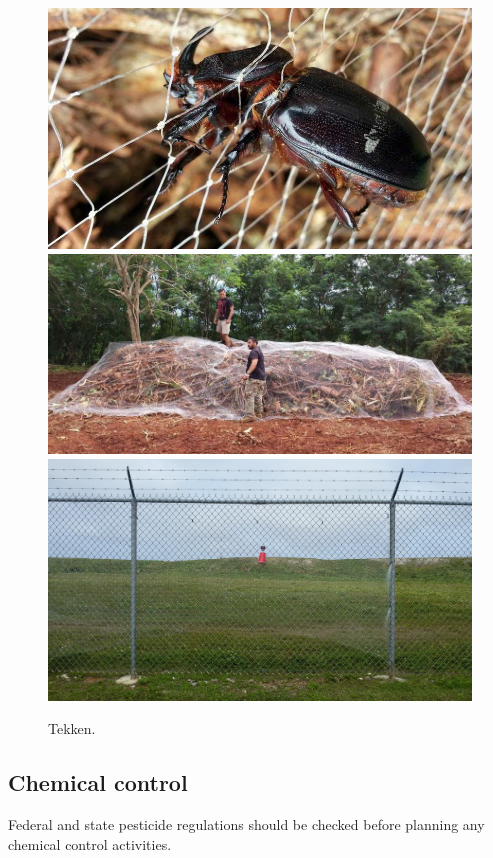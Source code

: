 \documentclass[twocolumn,letterpaper]{scrartcl}
\begin{document}
\begin{figure}[h]
	\centering
	\includegraphics[width=\linewidth]{images/tekken-beetle}
	\includegraphics[width=\linewidth]{images/tekken-pile}
	\includegraphics[width=\linewidth]{images/defence-trap}
	\caption{Tekken.}
	\label{fig:tekken-beetle}
\end{figure}

\subsection{Chemical control}
Federal and state pesticide regulations should be checked before planning any chemical control activities.
\end{document}

